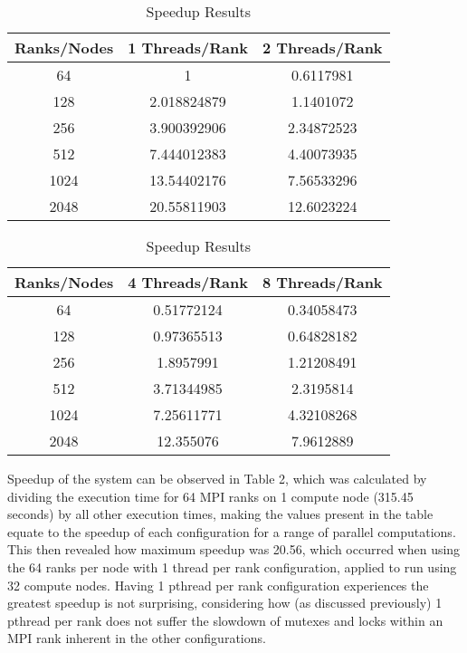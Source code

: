 \documentclass[letterpaper, 10 pt, conference]{ieeeconf}  %
\begin{document}
\begin{table}[!htbp]
\centering
 \begin{tabular}{||c | c | c ||} 
 \hline
 Ranks/Nodes & 1 Threads/Rank & 2 Threads/Rank \\ 
 \hline\hline
 64 & 1 & 0.6117981 \\ 
 \hline
 128 & 2.018824879 & 1.1401072\\
 \hline
 256 & 3.900392906 & 2.34872523\\
 \hline
 512 & 7.444012383 & 4.40073935\\ 
 \hline
 1024 & 13.54402176 & 7.56533296\\
 \hline
 2048 & 20.55811903 & 12.6023224\\
 \hline
\end{tabular}
\caption{Speedup Results}
\end{table}

\begin{table}[!htbp]
\centering
 \begin{tabular}{||c | c | c ||} 
 \hline
 Ranks/Nodes & 4 Threads/Rank & 8 Threads/Rank \\ 
 \hline\hline
 64 & 0.51772124 & 0.34058473 \\ 
 \hline \hline
 128 & 0.97365513 & 0.64828182\\
 \hline
 256 & 1.8957991 & 1.21208491\\
 \hline
 512 & 3.71344985 & 2.3195814\\ 
 \hline
 1024 & 7.25611771 & 4.32108268\\
 \hline
 2048 & 12.355076 & 7.9612889\\
 \hline
\end{tabular}
\caption{Speedup Results}
\end{table}

Speedup of the system can be observed in Table 2, which was calculated by dividing the execution time for 64 MPI ranks on 1 compute node (315.45 seconds) by all other execution times, making the values present in the table equate to the speedup of each configuration for a range of parallel computations.  This then revealed how maximum speedup was 20.56, which occurred when using the 64 ranks per node with 1 thread per rank configuration, applied to run using 32 compute nodes.  Having 1 pthread per rank configuration experiences the greatest speedup is not surprising, considering how (as discussed previously) 1 pthread per rank does not suffer the slowdown of mutexes and locks within an MPI rank inherent in the other configurations.  
\end{document}
